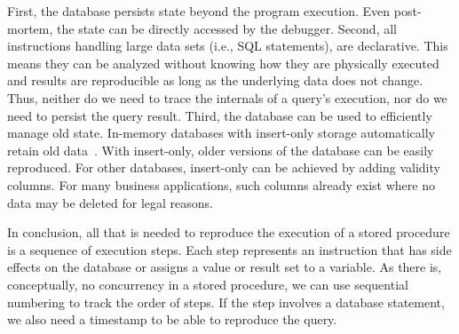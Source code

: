 \documentclass[english,conference,final]{IEEEtran}
\newcommand{\todo}[2][]{\pdfmargincomment[author={#1}]{#2}}
\begin{document}
First, the database persists state beyond the program execution.
Even post-mortem, the state can be directly accessed by the debugger.
Second, all instructions handling large data sets (i.e., SQL statements), are declarative.
This means they can be analyzed without knowing how they are physically executed and results are reproducible as long as the underlying data does not change.
Thus, neither do we need to trace the internals of a query's execution, nor do we need to persist the query result.
Third, the database can be used to efficiently manage old state.
In-memory databases with insert-only storage automatically retain old data~\cite{Plattner2009Acd}.
With insert-only, older versions of the database can be easily reproduced.
For other databases, insert-only can be achieved by adding validity columns.
For many business applications, such columns already exist where no data may be deleted for legal reasons.

In conclusion, all that is needed to reproduce the execution of a stored procedure is a sequence of execution steps.
Each step represents an instruction that has side effects on the database or assigns a value or result set to a variable.
As there is, conceptually, no concurrency in a stored procedure, we can use sequential numbering to track the order of steps.
If the step involves a database statement, we also need a timestamp to be able to reproduce the query.


\end{document}
